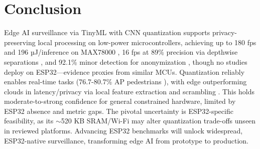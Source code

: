 \documentclass[12pt, a4paper]{article}
\begin{document}
\section{Conclusion}
Edge AI surveillance via TinyML with CNN quantization supports privacy-preserving local processing on low-power microcontrollers, achieving up to 180 fps and 196 µJ/inference on MAX78000 \cite{moosmann2023}, 16 fps at 89\% precision via depthwise separations \cite{zhao2020}, and 92.1\% minor detection for anonymization \cite{yuan2020}, though no studies deploy on ESP32---evidence proxies from similar MCUs. Quantization reliably enables real-time tasks (76.7-80.7\% AP pedestrians \cite{xu2021}), with edge outperforming clouds in latency/privacy via local feature extraction and scrambling \cite{fitwi2021}. This holds moderate-to-strong confidence for general constrained hardware, limited by ESP32 absence and metric gaps. The pivotal uncertainty is ESP32-specific feasibility, as its $\sim$520 KB SRAM/Wi-Fi may alter quantization trade-offs unseen in reviewed platforms. Advancing ESP32 benchmarks will unlock widespread, ESP32-native surveillance, transforming edge AI from prototype to production.
\end{document}
